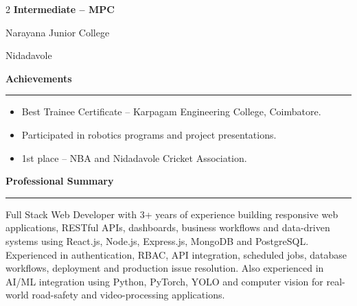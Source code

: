﻿\documentclass[10pt,a4paper]{article}
\newcommand{\cvsection}[1]{%
    \vspace{3pt}
    {\large\bfseries\textcolor{darkcol}{#1}}
    \par
    \vspace{2pt}
    {\color{accentcol}\rule{\linewidth}{1.1pt}}
    \vspace{3pt}
}
\begin{document}
\begin{paracol}{2}
{\small\bfseries Intermediate -- MPC}

\vspace{1pt}

{\small
Narayana Junior College
}

\vspace{1pt}

{\small
Nidadavole
}


\cvsection{Achievements}

\begin{itemize}

\item {\small
Best Trainee Certificate -- Karpagam Engineering College, Coimbatore.
}

\item {\small
Participated in robotics programs and project presentations.
}

\item {\small
1st place -- NBA and Nidadavole Cricket Association.
}

\end{itemize}


\switchcolumn


\raggedright


\cvsection{Professional Summary}

{\small
\justifying
Full Stack Web Developer with 3+ years of experience building
responsive web applications, RESTful APIs, dashboards, business
workflows and data-driven systems using React.js, Node.js,
Express.js, MongoDB and PostgreSQL. Experienced in authentication,
RBAC, API integration, scheduled jobs, database workflows,
deployment and production issue resolution. Also experienced in
AI/ML integration using Python, PyTorch, YOLO and computer vision
for real-world road-safety and video-processing applications.
}


\end{paracol}
\end{document}
